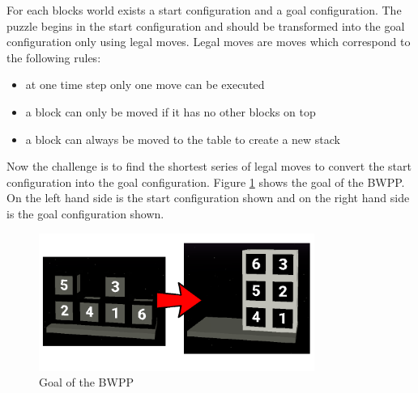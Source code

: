 \documentclass[runningheads]{llncs}
\begin{document}
        For each blocks world exists a start configuration and a goal configuration.
        The puzzle begins in the start configuration and should be transformed into the goal configuration only using legal moves.
        Legal moves are moves which correspond to the following rules:
        \begin{itemize}
            \item at one time step only one move can be executed 
            \item a block can only be moved if it has no other blocks on top
            \item a block can always be moved to the table to create a new stack
        \end{itemize}
        Now the challenge is to find the shortest series of legal moves to convert the start configuration into the goal configuration.\newline
        Figure \ref{goalOfTheBWPP} shows the goal of the BWPP.
        On the left hand side is the start configuration shown and on the right hand side is the goal configuration shown.
        \begin{figure}
            \centering
            \includegraphics[width=9cm]{start_goal_config.png}
            \caption{Goal of the BWPP}
            \label{goalOfTheBWPP}
        \end{figure}
\end{document}
